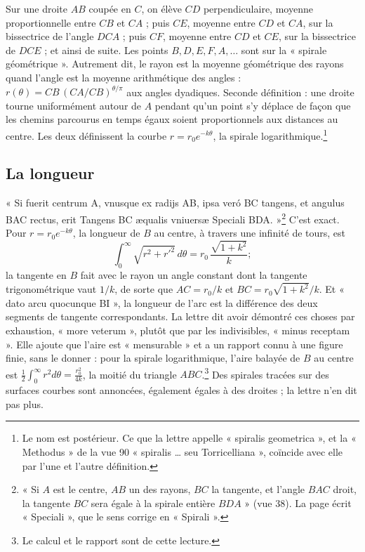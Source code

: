 \documentclass[11pt,a4paper]{article}
\begin{document}
Sur une droite $AB$ coupée en $C$, on élève $CD$ perpendiculaire, moyenne
proportionnelle entre $CB$ et $CA$ ; puis $CE$, moyenne entre $CD$ et $CA$, sur la
bissectrice de l'angle $DCA$ ; puis $CF$, moyenne entre $CD$ et $CE$, sur la
bissectrice de $DCE$ ; et ainsi de suite. Les points $B, D, E, F, A, \ldots$ sont
sur la « spirale géométrique ». Autrement dit, le rayon est la moyenne géométrique
des rayons quand l'angle est la moyenne arithmétique des angles :
$r(\theta) = CB\,(CA/CB)^{\theta/\pi}$ aux angles dyadiques. Seconde définition :
une droite tourne uniformément autour de $A$ pendant qu'un point s'y déplace de
façon que les chemins parcourus en temps égaux soient proportionnels aux
distances au centre. Les deux définissent la courbe $r = r_0e^{-k\theta}$, la
spirale logarithmique.\footnote{Le nom est postérieur. Ce que la lettre appelle
« spiralis geometrica », et la « Methodus » de la vue 90 « spiralis \ldots{} seu
Torricelliana », coïncide avec elle par l'une et l'autre définition.}

\subsection*{La longueur}

« Si fuerit centrum A, vnusque ex radijs AB, ipsa veró BC tangens, et angulus BAC
rectus, erit Tangens BC æqualis vniuersæ Speciali BDA. »\footnote{« Si $A$ est le
centre, $AB$ un des rayons, $BC$ la tangente, et l'angle $BAC$ droit, la tangente
$BC$ sera égale à la spirale entière $BDA$ » (vue 38). La page écrit
« Speciali », que le sens corrige en « Spirali ».} C'est exact. Pour $r=r_0e^{-k\theta}$, la
longueur de $B$ au centre, à travers une infinité de tours, est
\[
\int_0^\infty\sqrt{r^2+r'^2}\,d\theta = r_0\,\frac{\sqrt{1+k^2}}{k};
\]
la tangente en $B$ fait avec le rayon un angle constant dont la tangente
trigonométrique vaut $1/k$, de sorte que $AC = r_0/k$ et $BC = r_0\sqrt{1+k^2}/k$.
Et « dato arcu quocunque BI », la longueur de l'arc est la différence des deux
segments de tangente correspondants. La lettre dit avoir démontré ces choses par
exhaustion, « more veterum », plutôt que par les indivisibles, « minus receptam ».
Elle ajoute que l'aire est « mensurable » et a un rapport connu à une figure
finie, sans le donner : pour la spirale logarithmique, l'aire balayée de $B$ au
centre est $\tfrac12\int_0^\infty r^2d\theta = \frac{r_0^2}{4k}$, la moitié du
triangle $ABC$.\footnote{Le calcul et le rapport sont de cette lecture.} Des
spirales tracées sur des surfaces courbes sont annoncées, également égales à des
droites ; la lettre n'en dit pas plus.
\end{document}
